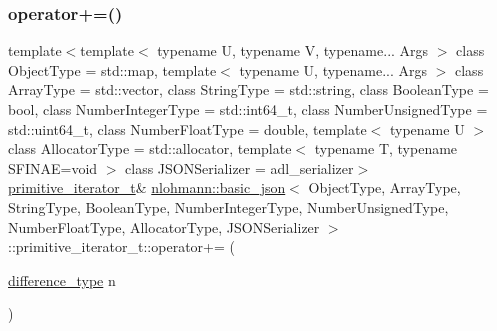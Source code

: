 \subsubsection{\texorpdfstring{operator+=()}{operator+=()}}
{\footnotesize\ttfamily template$<$template$<$ typename U, typename V, typename... Args $>$ class Object\+Type = std\+::map, template$<$ typename U, typename... Args $>$ class Array\+Type = std\+::vector, class String\+Type  = std\+::string, class Boolean\+Type  = bool, class Number\+Integer\+Type  = std\+::int64\+\_\+t, class Number\+Unsigned\+Type  = std\+::uint64\+\_\+t, class Number\+Float\+Type  = double, template$<$ typename U $>$ class Allocator\+Type = std\+::allocator, template$<$ typename T, typename S\+F\+I\+N\+A\+E=void $>$ class J\+S\+O\+N\+Serializer = adl\+\_\+serializer$>$ \\
\hyperlink{classnlohmann_1_1basic__json_1_1primitive__iterator__t}{primitive\+\_\+iterator\+\_\+t}\& \hyperlink{classnlohmann_1_1basic__json}{nlohmann\+::basic\+\_\+json}$<$ Object\+Type, Array\+Type, String\+Type, Boolean\+Type, Number\+Integer\+Type, Number\+Unsigned\+Type, Number\+Float\+Type, Allocator\+Type, J\+S\+O\+N\+Serializer $>$\+::primitive\+\_\+iterator\+\_\+t\+::operator+= (\begin{DoxyParamCaption}\item[{\hyperlink{classnlohmann_1_1basic__json_afe7c1303357e19cea9527af4e9a31d8f}{difference\+\_\+type}}]{n }\end{DoxyParamCaption})\hspace{0.3cm}{\ttfamily [inline]}}

\mbox{\label{classnlohmann_1_1basic__json_1_1primitive__iterator__t_a914f3b7b83db7fc4208afd9dd4f216fb}} 
